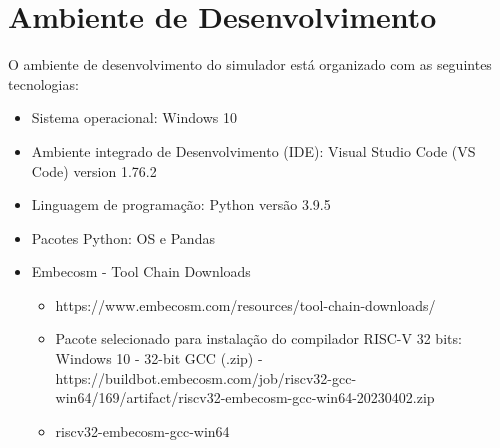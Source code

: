 
\section{Ambiente de Desenvolvimento}

O ambiente de desenvolvimento do simulador está organizado com as seguintes tecnologias:

\begin{itemize}
    \item Sistema operacional: Windows 10
    \item Ambiente integrado de Desenvolvimento (IDE): Visual Studio Code (VS Code) version 1.76.2
    \item Linguagem de programação: Python versão 3.9.5
    \item Pacotes Python: OS e Pandas 
    \item Embecosm - Tool Chain Downloads
    \begin{itemize}
        \item https://www.embecosm.com/resources/tool-chain-downloads/
        \item Pacote selecionado para instalação do compilador RISC-V 32 bits: Windows 10 - 32-bit GCC (.zip) - https://buildbot.embecosm.com/job/riscv32-gcc-win64/169/artifact/riscv32-embecosm-gcc-win64-20230402.zip
        \item riscv32-embecosm-gcc-win64
    \end{itemize}
\end{itemize}
